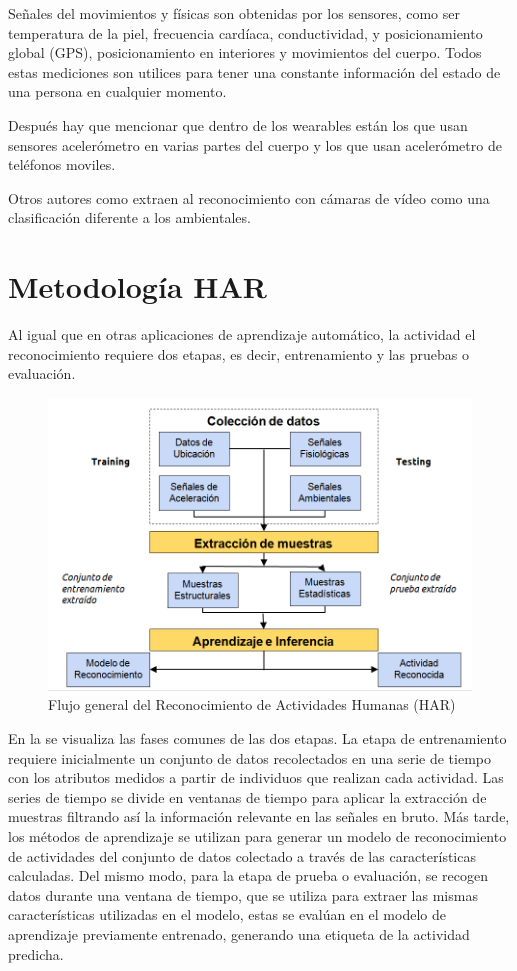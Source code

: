 Señales del movimientos y físicas son obtenidas por los sensores, como ser temperatura de la piel, frecuencia cardíaca, conductividad, y posicionamiento global (GPS), posicionamiento en interiores y movimientos del cuerpo. Todos estas mediciones son utilices para tener una constante información del estado de una persona en cualquier momento.

Después hay que mencionar que dentro de los wearables están los que usan sensores acelerómetro en varias partes del cuerpo y los que usan acelerómetro de teléfonos moviles.

Otros autores como \cite{karmul2010} extraen al reconocimiento con cámaras de vídeo como una clasificación diferente a los ambientales. 


\section{Metodología HAR}
\label{sec25:metodologia-har}
Al igual que en otras aplicaciones de aprendizaje automático, la actividad el reconocimiento requiere dos etapas, es decir, entrenamiento y las pruebas o evaluación.

\begin{figure}[!htbp]
\centering
	\includegraphics[width=0.7\linewidth]{capitulo-2/graphics/harsystem}
	\caption[Flujo HAR]{Flujo general del Reconocimiento de Actividades Humanas (HAR)}
	\label{fig:harsystem}
\end{figure}

En la  se visualiza las fases comunes de las dos etapas. La etapa de entrenamiento requiere inicialmente un conjunto de datos recolectados en una serie de tiempo con los atributos medidos a partir de individuos que realizan cada actividad. Las series de tiempo se divide en ventanas de tiempo para aplicar la extracción de muestras filtrando así la información relevante en las señales en bruto. Más tarde, los métodos de aprendizaje se utilizan para generar un modelo de reconocimiento de actividades del conjunto de datos colectado a través de las características calculadas. Del mismo modo, para la etapa de prueba o evaluación, se recogen datos durante una ventana de tiempo, que se utiliza para extraer las mismas características utilizadas en el modelo,  estas se evalúan en el modelo de aprendizaje previamente  entrenado, generando una etiqueta de la actividad predicha.

